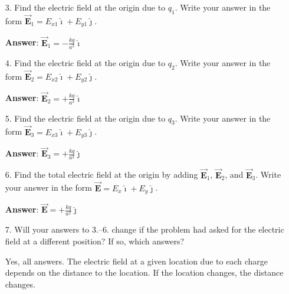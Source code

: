 \documentclass{article}
\newcommand{\ds}[0]{\displaystyle}
\newcommand{\ihat}[0]{\hat{\boldsymbol{\imath}}}
\newcommand{\jhat}[0]{\hat{\boldsymbol{\jmath}}}
\newcommand{\bfvec}[1]{\vec{\mathbf{#1}}}
\begin{document}
\begin{enumerate}

  \item[3.] Find the electric field at the origin due to $q_1$. Write your answer in the form $\bfvec{E}_1=E_{x1}\ihat + E_{y1}\jhat$.

            \ifsolutions
            {\bf Answer}: $\ds\bfvec{E}_1=-\frac{kq}{a^2}\ihat$
            \else

            \vskip 72pt
            \fi
            \ifsolutions\else
            \vskip 72pt
            \fi

  \item[4.] Find the electric field at the origin due to $q_2$. Write your answer in the form $\bfvec{E}_2=E_{x2}\ihat + E_{y2}\jhat$.

            \ifsolutions
            {\bf Answer}: $\ds\bfvec{E}_2=+\frac{kq}{a^2}\ihat$
            \else

            \vskip 72pt
            \fi
            \ifsolutions\else
            \vskip 72pt
            \fi

  \item[5.] Find the electric field at the origin due to $q_3$. Write your answer in the form $\bfvec{E}_3=E_{x3}\ihat + E_{y3}\jhat$.

            \ifsolutions
            {\bf Answer}: $\ds\bfvec{E}_3=+\frac{kq}{a^2}\jhat$
            \else

            \vskip 72pt
            \fi
            \ifsolutions\else
            \vskip 72pt
            \fi

  \item[6.] Find the total electric field at the origin by adding $\bfvec{E}_1$, $\bfvec{E}_2$, and $\bfvec{E}_3$. Write your answer in the form $\bfvec{E}=E_{x}\ihat + E_{y}\jhat$.

            \ifsolutions
            {\bf Answer}: $\ds\bfvec{E}=+\frac{kq}{a^2}\jhat$
            \else

            \vskip 72pt
            \fi
            \ifsolutions\else
            \vskip 72pt
            \fi

  \item[7.] Will your answers to 3.--6. change if the problem had asked for the electric field at a different position? If so, which answers?

            \ifsolutions
            Yes, all answers. The electric field at a given location due to each charge depends on the distance to the location. If the location changes, the distance changes.
            \else


\end{enumerate}
\end{document}
